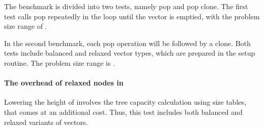 The benchmark is divided into two tests, namely pop and pop clone. The first test calls pop repeatedly in the loop until the vector is emptied, with the problem size range of \range{[20, \kilo{60}]}.

In the second benchmark, each pop operation will be followed by a clone. Both tests include balanced and relaxed vector types, which are prepared in the setup routine. The problem size range is \range{[20, \kilo{40}]}.

\paragraph{The overhead of relaxed nodes in \rrbtree{}}
Lowering the height of \rrbtree{} involves the tree capacity calculation using size tables, that comes at an additional cost. Thus, this test includes both balanced and relaxed variants of vectors.

